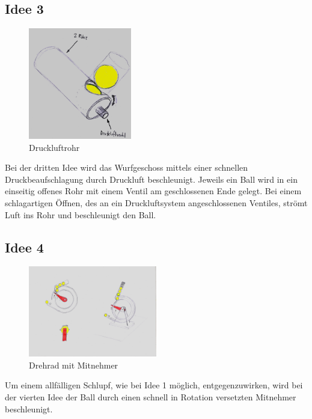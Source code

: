 \newpage
\subsection{Idee 3}
\begin{figure}[h!]
	\centering
	\includegraphics[width=0.4\textwidth]{../../fig/Druckluftrohr.jpg}
	\caption{Druckluftrohr}
	\label{fig:druckluftrohr}
\end{figure}
Bei der dritten Idee wird das Wurfgeschoss mittels einer schnellen Druckbeaufschlagung durch Druckluft beschleunigt. Jeweils ein Ball wird in ein einseitig offenes Rohr mit einem Ventil am geschlossenen Ende gelegt. Bei einem schlagartigen Öffnen, des an ein Druckluftsystem angeschlossenen Ventiles, strömt Luft ins Rohr und beschleunigt den Ball.

\subsection{Idee 4}
\begin{figure}[h!]
	\centering
	\includegraphics[width=0.5\textwidth]{../../fig/Drehrad_Mitnehmer.jpg}
	\caption{Drehrad mit Mitnehmer}
	\label{fig:mitnehmerrad}
\end{figure}
Um einem allfälligen Schlupf, wie bei Idee 1 möglich, entgegenzuwirken, wird bei der vierten Idee der Ball durch einen schnell in Rotation versetzten Mitnehmer beschleunigt.

